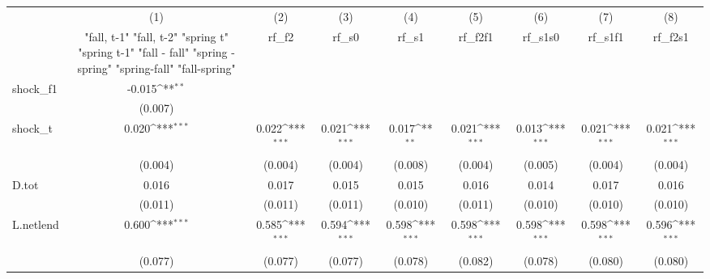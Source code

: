 {
\def\sym#1{\ifmmode^{#1}\else\(^{#1}\)\fi}
\begin{tabular}{l*{8}{c}}
\toprule
            &\multicolumn{1}{c}{(1)}&\multicolumn{1}{c}{(2)}&\multicolumn{1}{c}{(3)}&\multicolumn{1}{c}{(4)}&\multicolumn{1}{c}{(5)}&\multicolumn{1}{c}{(6)}&\multicolumn{1}{c}{(7)}&\multicolumn{1}{c}{(8)}\\
            &\multicolumn{1}{c}{  "fall, t-1" "fall, t-2" "spring t" "spring t-1"  "fall - fall" "spring - spring" "spring-fall" "fall-spring" }&\multicolumn{1}{c}{rf\_f2}&\multicolumn{1}{c}{rf\_s0}&\multicolumn{1}{c}{rf\_s1}&\multicolumn{1}{c}{rf\_f2f1}&\multicolumn{1}{c}{rf\_s1s0}&\multicolumn{1}{c}{rf\_s1f1}&\multicolumn{1}{c}{rf\_f2s1}\\
\midrule
shock\_f1    &      -0.015\sym{**} &                     &                     &                     &                     &                     &                     &                     \\
            &     (0.007)         &                     &                     &                     &                     &                     &                     &                     \\
\addlinespace
shock\_t     &       0.020\sym{***}&       0.022\sym{***}&       0.021\sym{***}&       0.017\sym{**} &       0.021\sym{***}&       0.013\sym{***}&       0.021\sym{***}&       0.021\sym{***}\\
            &     (0.004)         &     (0.004)         &     (0.004)         &     (0.008)         &     (0.004)         &     (0.005)         &     (0.004)         &     (0.004)         \\
\addlinespace
D.tot       &       0.016         &       0.017         &       0.015         &       0.015         &       0.016         &       0.014         &       0.017         &       0.016         \\
            &     (0.011)         &     (0.011)         &     (0.011)         &     (0.010)         &     (0.011)         &     (0.010)         &     (0.010)         &     (0.010)         \\
\addlinespace
L.netlend   &       0.600\sym{***}&       0.585\sym{***}&       0.594\sym{***}&       0.598\sym{***}&       0.598\sym{***}&       0.598\sym{***}&       0.598\sym{***}&       0.596\sym{***}\\
            &     (0.077)         &     (0.077)         &     (0.077)         &     (0.078)         &     (0.082)         &     (0.078)         &     (0.080)         &     (0.080)         \\

\end{tabular}}

